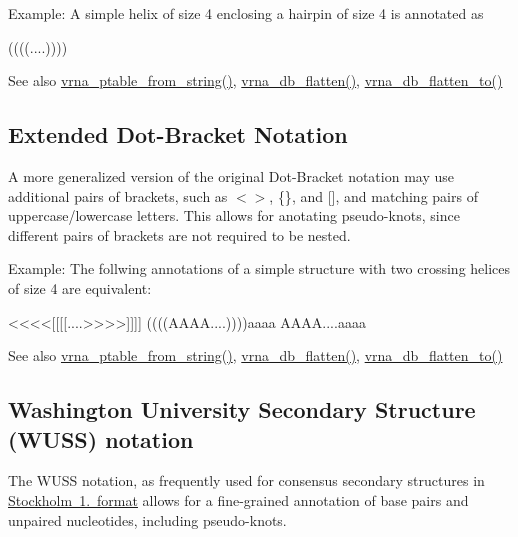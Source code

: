 Example\+: A simple helix of size 4 enclosing a hairpin of size 4 is annotated as \begin{DoxyVerb}((((....))))
\end{DoxyVerb}


\begin{DoxySeeAlso}{See also}
\mbox{\hyperlink{group__struct__utils__pair__table_gac76c9ef3de507748fb0416a59323362b}{vrna\+\_\+ptable\+\_\+from\+\_\+string()}}, \mbox{\hyperlink{group__struct__utils__dot__bracket_gafd1304f5a86e2e3f1425e725cde44fa2}{vrna\+\_\+db\+\_\+flatten()}}, \mbox{\hyperlink{group__struct__utils__dot__bracket_ga690425199c8b71545e7196e3af1436f8}{vrna\+\_\+db\+\_\+flatten\+\_\+to()}}
\end{DoxySeeAlso}
\hypertarget{rna_structure_notations_dot-bracket-ext-notation}{}\subsection{Extended Dot-\/\+Bracket Notation}\label{rna_structure_notations_dot-bracket-ext-notation}
A more generalized version of the original Dot-\/\+Bracket notation may use additional pairs of brackets, such as {\ttfamily $<$$>$}, {\ttfamily \{\}}, and {\ttfamily \mbox{[}\mbox{]}}, and matching pairs of uppercase/lowercase letters. This allows for anotating pseudo-\/knots, since different pairs of brackets are not required to be nested.

Example\+: The follwing annotations of a simple structure with two crossing helices of size 4 are equivalent\+: \begin{DoxyVerb}<<<<[[[[....>>>>]]]]
((((AAAA....))))aaaa
AAAA{{{{....aaaa}}}}
\end{DoxyVerb}


\begin{DoxySeeAlso}{See also}
\mbox{\hyperlink{group__struct__utils__pair__table_gac76c9ef3de507748fb0416a59323362b}{vrna\+\_\+ptable\+\_\+from\+\_\+string()}}, \mbox{\hyperlink{group__struct__utils__dot__bracket_gafd1304f5a86e2e3f1425e725cde44fa2}{vrna\+\_\+db\+\_\+flatten()}}, \mbox{\hyperlink{group__struct__utils__dot__bracket_ga690425199c8b71545e7196e3af1436f8}{vrna\+\_\+db\+\_\+flatten\+\_\+to()}}
\end{DoxySeeAlso}
\hypertarget{rna_structure_notations_wuss-notation}{}\subsection{Washington University Secondary Structure (\+W\+U\+S\+S) notation}\label{rna_structure_notations_wuss-notation}
The W\+U\+SS notation, as frequently used for consensus secondary structures in \mbox{\hyperlink{file_formats_msa-formats-stockholm}{Stockholm 1. format}} allows for a fine-\/grained annotation of base pairs and unpaired nucleotides, including pseudo-\/knots.

